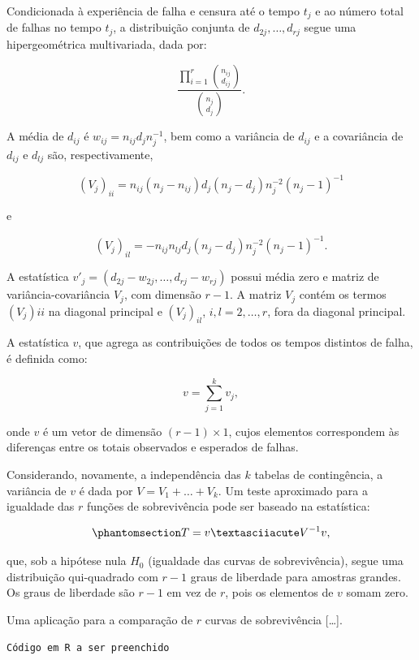 \documentclass[
  12pt,
  letterpaper,
  DIV=11,
  numbers=noendperiod]{scrreprt}
\begin{document}
Condicionada à experiência de falha e censura até o tempo \(t_{j}\) e ao
número total de falhas no tempo \(t_{j}\), a distribuição conjunta de
\(d_{2j}, \ldots,d_{rj}\) segue uma hipergeométrica multivariada, dada
por:

\[
\dfrac{ \prod_{i = 1}^{r} \binom{ n_{ij }}{ d_{ij} } }{ \binom{ n_{j }}{ d_{j} } }.
\]

A média de \(d_{ij}\) é \(w_{ij} = n_{ij} d_{j} n_{j}^{-1}\), bem como a
variância de \(d_{ij}\) e a covariância de \(d_{ij}\) e \(d_{lj}\) são,
respectivamente,

\[
(V_{j})_{ii} = n_{ij} (n_{j} - n_{ij}) d_{j} (n_{j} - d_{j}) n_{j}^{-2} (n_{j} - 1)^{-1}
\]

e

\[
(V_{j})_{il} = - n_{ij} n_{lj} d_{j} (n_{j} - d_{j}) n_{j}^{-2} (n_{j} - 1)^{-1}.
\]

A estatística \(v'_{j} = (d_{2j} - w_{2j}, \ldots, d_{rj} - w_{rj})\)
possui média zero e matriz de variância-covariância \(V_{j}\), com
dimensão \(r - 1\). A matriz \(V_{j}\) contém os termos \((V_{j}){ii}\)
na diagonal principal e \((V_{j})_{il}\), \(i,l = 2, \ldots,r\), fora da
diagonal principal.

A estatística \(v\), que agrega as contribuições de todos os tempos
distintos de falha, é definida como:

\[
v = \sum_{j = 1}^{k} v_{j},
\]

onde \(v\) é um vetor de dimensão \((r - 1) \times 1\), cujos elementos
correspondem às diferenças entre os totais observados e esperados de
falhas.

Considerando, novamente, a independência das \(k\) tabelas de
contingência, a variância de \(v\) é dada por
\(V = V_{1} + \ldots + V_{k}\). Um teste aproximado para a igualdade das
\(r\) funções de sobrevivência pode ser baseado na estatística:

\begin{equation}\phantomsection\label{eq-EstTestelogrankGeneralizado}{
T = v´V^{-1} v,
}\end{equation}

que, sob a hipótese nula \(H_{0}\) (igualdade das curvas de
sobrevivência), segue uma distribuição qui-quadrado com \(r - 1\) graus
de liberdade para amostras grandes. Os graus de liberdade são \(r - 1\)
em vez de \(r\), pois os elementos de \(v\) somam zero.

Uma aplicação para a comparação de \(r\) curvas de sobrevivência
{[}\ldots{]}.

\begin{verbatim}
Código em R a ser preenchido
\end{verbatim}
\end{document}
